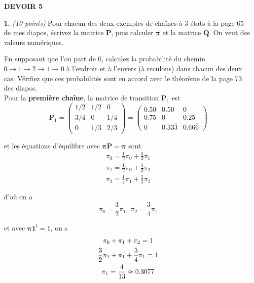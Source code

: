 \documentclass{article}
\begin{document}

\vspace{6cm}
\begin{center} \HUGE \textbf{DEVOIR 5}\end{center}

\newpage
\noindent \textbf{1.} \textit{(10 points)} Pour chacun des deux exemples
de chaînes à 3 états à la page 65 de mes diapos, écrivez la matrice 
$\boldsymbol{P}$, puis calculer $\boldsymbol{\pi}$ et la matrice
$\boldsymbol{Q}$. On veut des valeurs numériques.

\vspace{.2cm}
\noindent En supposant que l'on part de 0, calculez la probabilité du chemin
$0\to 1\to 2\to 1\to 0$ à l'endroit et à l'envers (à reculons) dans 
chacun des deux cas. Vérifiez que ces probabilités sont en accord avec
le théorème de la page 73 des diapos. \\

Pour la \textbf{première chaîne}, la matrice de transition $\boldsymbol{P}_1$ est
\begin{equation}
    \boldsymbol{P}_1=\begin{pmatrix}
        1/2 & 1/2 & 0 \\
        3/4 & 0 & 1/4 \\
        0 & 1/3 & 2/3
    \end{pmatrix}=\begin{pmatrix}
        0.50 & 0.50 & 0 \\
        0.75 & 0 & 0.25 \\
        0 & 0.33\overline{3} & 0.66\overline{6}
    \end{pmatrix}
\end{equation}

et les équations d'équilibre avec $\boldsymbol{\pi}\boldsymbol{P}=\boldsymbol{\pi}$ sont
\begin{gather}
    \pi_0=\frac{1}{2}\pi_0+\frac{3}{4}\pi_1 \\
    \pi_1=\frac{1}{2}\pi_0+\frac{1}{3}\pi_2 \\
    \pi_2=\frac{1}{4}\pi_1+\frac{2}{3}\pi_2 
\end{gather}

d'où on a
\[
    \pi_0=\frac{3}{2}\pi_1,\ \pi_2=\frac{3}{4}\pi_1
\]

et avec $\boldsymbol{\pi}\boldsymbol{1}^t=1$, on a
\begin{gather}
    \pi_0+\pi_1+\pi_2=1 \notag \\
    \frac{3}{2}\pi_1+\pi_1+\frac{3}{4}\pi_1=1 \notag \\
    \pi_1=\frac{4}{13}\approx0.3077
\end{gather}
\end{document}
